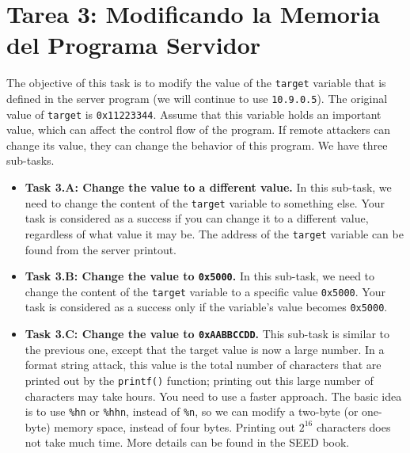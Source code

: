 \section{Tarea 3: Modificando la Memoria del Programa Servidor}

The objective of this task is to modify the value of the 
\texttt{target} variable that is defined in the 
server program (we will continue to use \texttt{10.9.0.5}). 
The original value of \texttt{target} is \texttt{0x11223344}. 
Assume that this variable holds an important value, which can affect the 
control flow of the program. If remote attackers can change its value, 
they can change the behavior of this program. We have three sub-tasks. 

\begin{itemize} 
\item \textbf{Task 3.A: Change the value to a different value.}
In this sub-task, we need to change the content of the \texttt{target} variable
to something else. Your task is considered as a success if you can change it to a
different value, regardless of what value it may be. The address of 
the \texttt{target} variable can be found from the server printout. 


\item \textbf{Task 3.B: Change the value to \texttt{0x5000}.}  
In this sub-task, we need to change the content of the \texttt{target} variable
to a specific value \texttt{0x5000}. Your task is considered as 
a success only if the variable's value becomes \texttt{0x5000}. 


\item \textbf{Task 3.C: Change the value to \texttt{0xAABBCCDD}.}  
This sub-task is similar to the previous one, except that the target value is 
now a large number. In a format string attack, this 
value is the total number of characters that
are printed out by the \texttt{printf()} function; printing out 
this large number of characters may take hours. You need to use a faster approach. The 
basic idea is to use \texttt{\%hn} or \texttt{\%hhn}, instead of \texttt{\%n}, so we can modify 
a two-byte (or one-byte) memory space, instead of four bytes. Printing out
$2^{16}$ characters does not take much time. More details 
can be found in the SEED book.
\end{itemize} 



